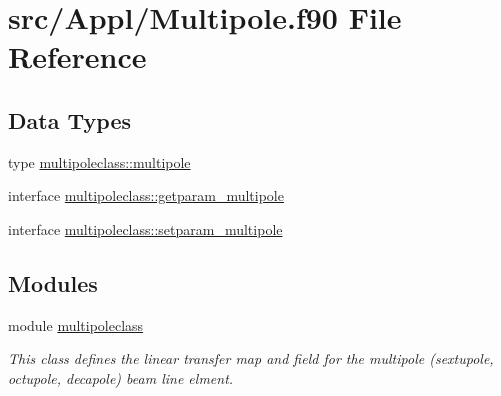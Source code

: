 \hypertarget{_multipole_8f90}{}\section{src/\+Appl/\+Multipole.f90 File Reference}
\label{_multipole_8f90}
\subsection*{Data Types}
\begin{DoxyCompactItemize}
\item 
type \mbox{\hyperlink{namespacemultipoleclass_structmultipoleclass_1_1multipole}{multipoleclass\+::multipole}}
\item 
interface \mbox{\hyperlink{interfacemultipoleclass_1_1getparam__multipole}{multipoleclass\+::getparam\+\_\+multipole}}
\item 
interface \mbox{\hyperlink{interfacemultipoleclass_1_1setparam__multipole}{multipoleclass\+::setparam\+\_\+multipole}}
\end{DoxyCompactItemize}
\subsection*{Modules}
\begin{DoxyCompactItemize}
\item 
module \mbox{\hyperlink{namespacemultipoleclass}{multipoleclass}}
\begin{DoxyCompactList}\small\item\em This class defines the linear transfer map and field for the multipole (sextupole, octupole, decapole) beam line elment. \end{DoxyCompactList}\end{DoxyCompactItemize}
